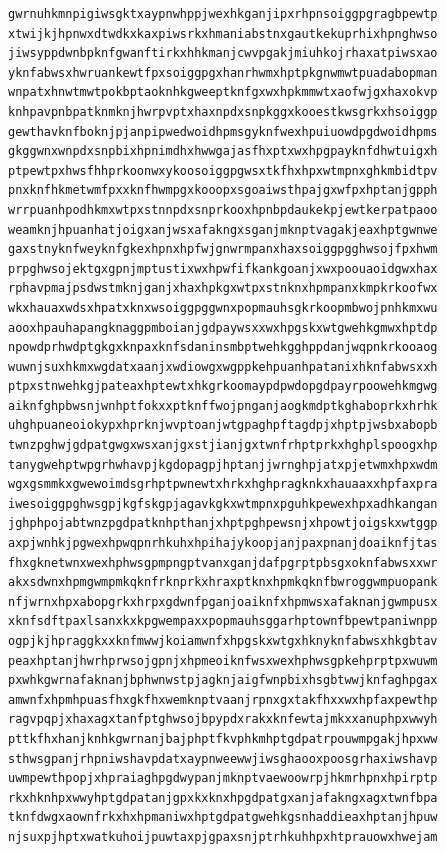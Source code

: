 \documentclass[11pt,letterpaper]{exam}
\begin{document}
\begin{questions}
\begin{verbatim}
gwrnuhkmnpigiwsgktxaypnwhppjwexhkganjipxrhpnsoiggpgragbpewtp
xtwijkjhpnwxdtwdkxkaxpiwsrkxhmaniabstnxgautkekuprhixhpnghwso
jiwsyppdwnbpknfgwanftirkxhhkmanjcwvpgakjmiuhkojrhaxatpiwsxao
yknfabwsxhwruankewtfpxsoiggpgxhanrhwmxhptpkgnwmwtpuadabopman
wnpatxhnwtmwtpokbptaoknhkgweeptknfgxwxhpkmmwtxaofwjgxhaxokvp
knhpavpnbpatknmknjhwrpvptxhaxnpdxsnpkggxkooestkwsgrkxhsoiggp
gewthavknfboknjpjanpipwedwoidhpmsgyknfwexhpuiuowdpgdwoidhpms
gkggwnxwnpdxsnpbixhpnimdhxhwwgajasfhxptxwxhpgpayknfdhwtuigxh
ptpewtpxhwsfhhprkoonwxykoosoiggpgwsxtkfhxhpxwtmpnxghkmbidtpv
pnxknfhkmetwmfpxxknfhwmpgxkooopxsgoaiwsthpajgxwfpxhptanjgpph
wrrpuanhpodhkmxwtpxstnnpdxsnprkooxhpnbpdaukekpjewtkerpatpaoo
weamknjhpuanhatjoigxanjwsxafakngxsganjmknptvagakjeaxhptgwnwe
gaxstnyknfweyknfgkexhpnxhpfwjgnwrmpanxhaxsoiggpgghwsojfpxhwm
prpghwsojektgxgpnjmptustixwxhpwfifkankgoanjxwxpoouaoidgwxhax
rphavpmajpsdwstmknjganjxhaxhpkgxwtpxstnknxhpmpanxkmpkrkoofwx
wkxhauaxwdsxhpatxknxwsoiggpggwnxpopmauhsgkrkoopmbwojpnhkmxwu
aooxhpauhapangknaggpmboianjgdpaywsxxwxhpgskxwtgwehkgmwxhptdp
npowdprhwdptgkgxknpaxknfsdaninsmbptwehkgghppdanjwqpnkrkooaog
wuwnjsuxhkmxwgdatxaanjxwdiowgxwgppkehpuanhpatanixhknfabwsxxh
ptpxstnwehkgjpateaxhptewtxhkgrkoomaypdpwdopgdpayrpoowehkmgwg
aiknfghpbwsnjwnhptfokxxptknffwojpnganjaogkmdptkghaboprkxhrhk
uhghpuaneoiokypxhprknjwvptoanjwtgpaghpftagdpjxhptpjwsbxabopb
twnzpghwjgdpatgwgxwsxanjgxstjianjgxtwnfrhptprkxhghplspoogxhp
tanygwehptwpgrhwhavpjkgdopagpjhptanjjwrnghpjatxpjetwmxhpxwdm
wgxgsmmkxgwewoimdsgrhptpwnewtxhrkxhghpragknkxhauaaxxhpfaxpra
iwesoiggpghwsgpjkgfskgpjagavkgkxwtmpnxpguhkpewexhpxadhkangan
jghphpojabtwnzpgdpatknhpthanjxhptpghpewsnjxhpowtjoigskxwtggp
axpjwnhkjpgwexhpwqpnrhkuhxhpihajykoopjanjpaxpnanjdoaiknfjtas
fhxgknetwnxwexhphwsgpmpngptvanxganjdafpgrptpbsgxoknfabwsxxwr
akxsdwnxhpmgwmpmkqknfrknprkxhraxptknxhpmkqknfbwroggwmpuopank
nfjwrnxhpxabopgrkxhrpxgdwnfpganjoaiknfxhpmwsxafaknanjgwmpusx
xknfsdftpaxlsanxkxkpgwempaxxpopmauhsggarhptownfbpewtpaniwnpp
ogpjkjhpraggkxxknfmwwjkoiamwnfxhpgskxwtgxhknyknfabwsxhkgbtav
peaxhptanjhwrhprwsojgpnjxhpmeoiknfwsxwexhphwsgpkehprptpxwuwm
pxwhkgwrnafaknanjbphwnwstpjagknjaigfwnpbixhsgbtwwjknfaghpgax
amwnfxhpmhpuasfhxgkfhxwemknptvaanjrpnxgxtakfhxxwxhpfaxpewthp
ragvpqpjxhaxagxtanfptghwsojbpypdxrakxknfewtajmkxxanuphpxwwyh
pttkfhxhanjknhkgwrnanjbajphptfkvphkmhptgdpatrpouwmpgakjhpxww
sthwsgpanjrhpniwshavpdatxaypnweewwjiwsghaooxpoosgrhaxiwshavp
uwmpewthpopjxhpraiaghpgdwypanjmknptvaewoowrpjhkmrhpnxhpirptp
rkxhknhpxwwyhptgdpatanjgpxkxknxhpgdpatgxanjafakngxagxtwnfbpa
tknfdwgxaownfrkxhxhpmaniwxhptgdpatgwehkgsnhaddieaxhptanjhpuw
njsuxpjhptxwatkuhoijpuwtaxpjgpaxsnjptrhkuhhpxhtprauowxhwejam

\end{verbatim}
\end{questions}
\end{document}
